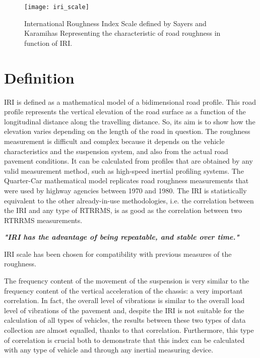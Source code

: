 \documentclass[tesi]{subfiles}
\begin{document}
\begin{figure}[H]
\texttt{[image: iri\_scale]}
\caption{International Roughness Index Scale defined by Sayers and Karamihas \cite{little_book}
Representing the characteristic of road roughness in function of IRI.}
\label{fig:International Roughness Index Scale}
\end{figure}

\section{Definition}\label{sc:IRI Definition}
IRI is defined as a mathematical model of a bidimensional road profile. This road profile represents the vertical elevation of the road surface as a function of the longitudinal distance along the travelling distance\cite{wang2006road}. So, its aim is to show how the elevation varies depending on the length of the road in question.
The roughness measurement is difficult and complex because it depends on the vehicle characteristics and the suspension system, and also from the actual road pavement conditions. It can be calculated from profiles that are obtained by any valid measurement method, such as high-speed inertial profiling systems.
The Quarter-Car mathematical model replicates road roughness measurements that were used by highway agencies between 1970 and 1980. The IRI is statistically equivalent to the other already-in-use methodologies, i.e. the correlation between the IRI and any type of RTRRMS, is as good as the correlation between two RTRRMS measurements.

\textbf{\textit{"IRI has the advantage of being repeatable, and stable over time."}}

IRI scale has been chosen for compatibility with previous measures of the roughness.


The frequency content of the movement of the suspension is very similar to the frequency content of the vertical acceleration of the chassis: a very important correlation. In fact, the overall level of vibrations is similar to the overall load level of vibrations of the pavement and, despite the IRI is not suitable for the calculation of all types of vehicles, the results between these two types of data collection are almost equalled, thanks to that correlation. Furthermore, this type of correlation is crucial both to demonstrate that this index can be calculated with any type of vehicle and through any inertial measuring device.
\end{document}
